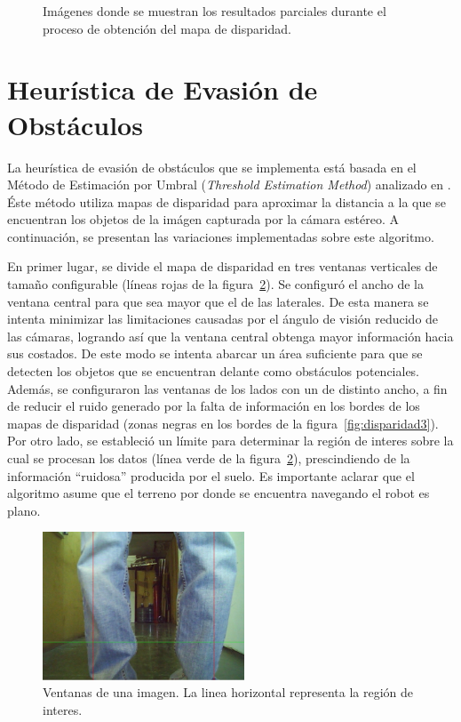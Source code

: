 \documentclass[journal]{IEEEtran}
\begin{document}
\begin{figure}[ht]
\caption{Im\'agenes donde se muestran los resultados parciales durante el proceso de obtenci\'on del mapa de disparidad.}
\label{fig:piernas}
\end{figure}

\section{Heur\'istica de Evasi\'on de Obst\'aculos}
\label{sec:heuristica}

La heur\'istica de evasi\'on de obst\'aculos que se implementa est\'a basada en el M\'etodo de Estimaci\'on por Umbral (\emph{Threshold Estimation Method}) analizado en \cite{KNG10}. \'Este m\'etodo utiliza mapas de disparidad para aproximar la distancia a la que se encuentran los objetos de la im\'agen capturada por la c\'amara est\'ereo. A continuaci\'on, se presentan las variaciones implementadas sobre este algoritmo.

En primer lugar, se divide el mapa de disparidad en tres ventanas verticales de tama\~no configurable (l\'ineas rojas de la figura~\ref{fig:piernas_cerca}). Se configur\'o el ancho de la ventana central para que sea mayor que el de las laterales. De esta manera se intenta minimizar las limitaciones causadas por el \'angulo de visi\'on reducido de las c\'amaras, logrando as\'i que la ventana central obtenga mayor informaci\'on hacia sus costados. De este modo se intenta abarcar un \'area suficiente para que se detecten los objetos que se encuentran delante como obst\'aculos potenciales. Adem\'as, se configuraron las ventanas de los lados con un de distinto ancho, a fin de reducir el ruido generado por la falta de informaci\'on en los bordes de los mapas de disparidad (zonas negras en los bordes de la figura~\ref{fig:disparidad3}). Por otro lado, se estableci\'o un l\'imite para determinar la regi\'on de interes sobre la cual se procesan los datos \cite{H09} (l\'inea verde de la figura~\ref{fig:piernas_cerca}), prescindiendo de la informaci\'on ``ruidosa'' producida por el suelo. Es importante aclarar que el algoritmo asume que el terreno por donde se encuentra navegando el robot es plano.

\begin{figure}[ht]
	\begin{center}
		\includegraphics[width=6cm]{./images/piernas_cerca.jpg}
	\end{center}
	\caption{Ventanas de una imagen. La linea horizontal representa la regi\'on de interes.}
	\label{fig:piernas_cerca}
\end{figure}
\end{document}
